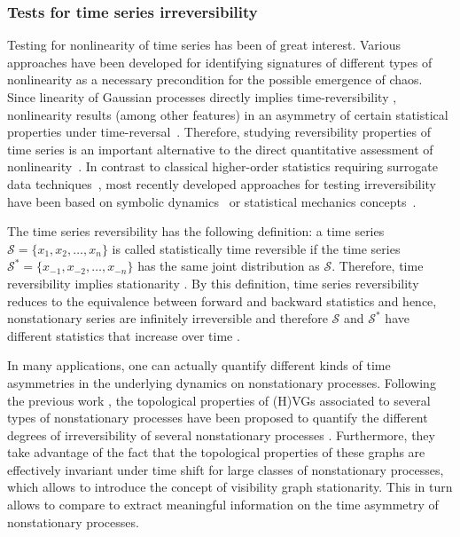 		\subsubsection{Tests for time series irreversibility}
		Testing for nonlinearity of time series has been of great interest. Various approaches have been developed for identifying signatures of different types of nonlinearity as a necessary precondition for the possible emergence of chaos. Since linearity of Gaussian processes directly implies time-reversibility \cite{Weiss1975,Lawrance1991,Diks1995}, nonlinearity results (among other features) in an asymmetry of certain statistical properties under time-reversal~\cite{Theiler1992}. Therefore, studying reversibility properties of time series is an important alternative to the direct quantitative assessment of nonlinearity~\cite{Voss1998}. In contrast to classical higher-order statistics requiring surrogate data techniques~\cite{Theiler1992}, most recently developed approaches for testing irreversibility have been based on symbolic dynamics~\cite{Daw2000,Kennel2004,Cammarota2007} or statistical mechanics concepts~\cite{Costa2005,Porporato2007,Roldan2010}. 
		
		The time series reversibility has the following definition: a time series $\mathcal{S} = \{ x_1, x_2, \dots, x_n \}$ is called statistically time reversible if the time series $\mathcal{S}^{\ast} = \{x_{-1}, x_{-2}, \dots, x_{-n} \}$ has the same joint distribution as $\mathcal{S}$. Therefore, time reversibility implies stationarity \cite{Lawrance1991}. By this definition, time series reversibility reduces to the equivalence between forward and backward statistics and hence, nonstationary series are infinitely irreversible and therefore $\mathcal{S}$ and $\mathcal{S}^{\ast}$ have different statistics that increase over time \cite{Weiss1975}. 

		In many applications, one can actually quantify different kinds of time asymmetries in the underlying dynamics on nonstationary processes. Following the previous work \cite{Lacasa2012}, the topological properties of (H)VGs associated to several types of nonstationary processes have been proposed to quantify the different degrees of irreversibility of several nonstationary processes \cite{Lacasa2015}. Furthermore, they take advantage of the fact that the topological properties of these graphs are effectively invariant under time shift for large classes of nonstationary processes, which allows to introduce the concept of visibility graph stationarity. This in turn allows to compare to extract meaningful information on the time asymmetry of nonstationary processes. 

